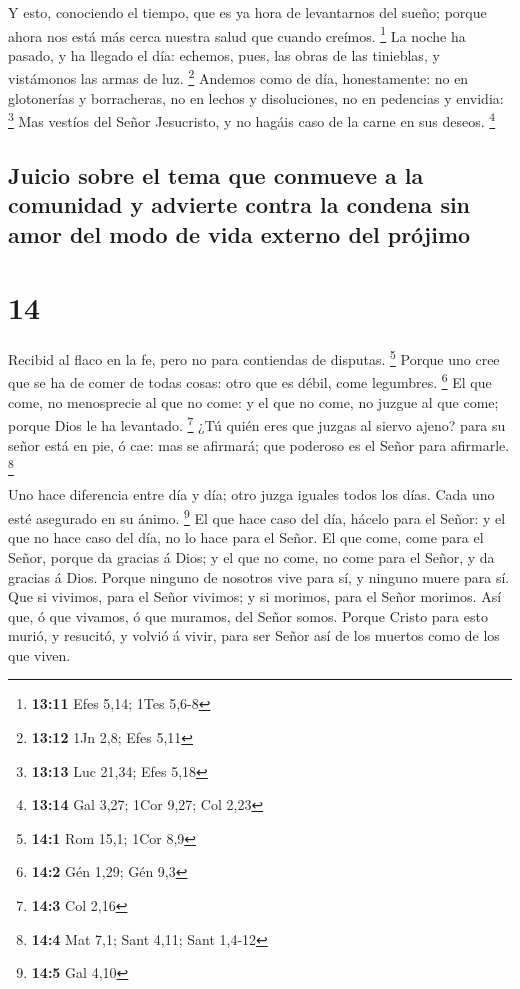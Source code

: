  Y esto, conociendo el tiempo, que es ya hora de
levantarnos del sueño; porque ahora nos está más cerca nuestra salud que
cuando creímos. \footnote{\textbf{13:11} Efes 5,14; 1Tes 5,6-8}
 La noche ha pasado, y ha llegado el día: echemos, pues,
las obras de las tinieblas, y vistámonos las armas de luz. \footnote{\textbf{13:12}
  1Jn 2,8; Efes 5,11}  Andemos como de día, honestamente:
no en glotonerías y borracheras, no en lechos y disoluciones, no en
pedencias y envidia: \footnote{\textbf{13:13} Luc 21,34; Efes 5,18}
 Mas vestíos del Señor Jesucristo, y no hagáis caso de la
carne en sus deseos. \footnote{\textbf{13:14} Gal 3,27; 1Cor 9,27; Col
  2,23}

\hypertarget{juicio-sobre-el-tema-que-conmueve-a-la-comunidad-y-advierte-contra-la-condena-sin-amor-del-modo-de-vida-externo-del-pruxf3jimo}{%
\subsection{Juicio sobre el tema que conmueve a la comunidad y advierte
contra la condena sin amor del modo de vida externo del
prójimo}\label{juicio-sobre-el-tema-que-conmueve-a-la-comunidad-y-advierte-contra-la-condena-sin-amor-del-modo-de-vida-externo-del-pruxf3jimo}}

\hypertarget{section-13}{%
\section{14}\label{section-13}}

 Recibid al flaco en la fe, pero no para contiendas de
disputas. \footnote{\textbf{14:1} Rom 15,1; 1Cor 8,9} 
Porque uno cree que se ha de comer de todas cosas: otro que es débil,
come legumbres. \footnote{\textbf{14:2} Gén 1,29; Gén 9,3} 
El que come, no menosprecie al que no come: y el que no come, no juzgue
al que come; porque Dios le ha levantado. \footnote{\textbf{14:3} Col
  2,16}  ¿Tú quién eres que juzgas al siervo ajeno? para su
señor está en pie, ó cae: mas se afirmará; que poderoso es el Señor para
afirmarle. \footnote{\textbf{14:4} Mat 7,1; Sant 4,11; Sant 1,4-12}

 Uno hace diferencia entre día y día; otro juzga iguales
todos los días. Cada uno esté asegurado en su ánimo. \footnote{\textbf{14:5}
  Gal 4,10}  El que hace caso del día, hácelo para el Señor:
y el que no hace caso del día, no lo hace para el Señor. El que come,
come para el Señor, porque da gracias á Dios; y el que no come, no come
para el Señor, y da gracias á Dios.  Porque ninguno de
nosotros vive para sí, y ninguno muere para sí.  Que si
vivimos, para el Señor vivimos; y si morimos, para el Señor morimos. Así
que, ó que vivamos, ó que muramos, del Señor somos.  Porque
Cristo para esto murió, y resucitó, y volvió á vivir, para ser Señor así
de los muertos como de los que viven.

